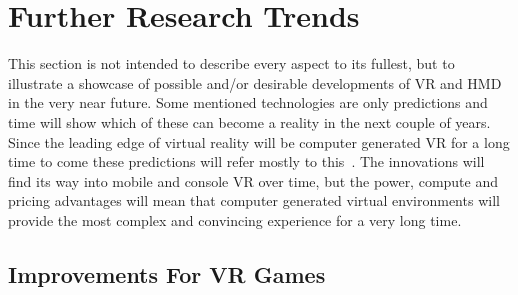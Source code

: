 \section{Further Research Trends}

This section is not intended to describe every aspect to its fullest, but to illustrate a showcase of possible and/or desirable developments of VR and HMD in the very near future. \newline
Some mentioned technologies are only predictions and time will show which of these can become a reality in the next couple of years. \newline
Since the leading edge of virtual reality will be computer generated VR for a long time to come these predictions will refer mostly to this~\cite{online:oculusKeynote}. The innovations will find its way into mobile and console VR over time, but the power, compute and pricing advantages will mean that computer generated virtual environments will provide the most complex and convincing experience for a very long time.

\subsection{Improvements For VR Games}
%
%
%
%
%

